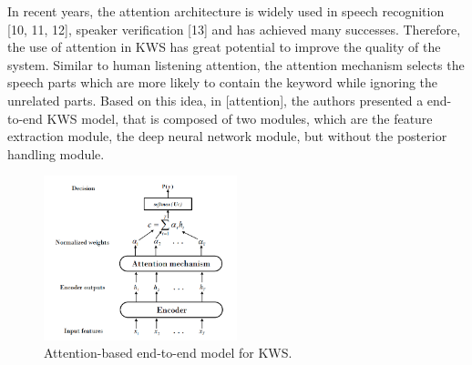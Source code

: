         In recent years, the attention architecture is widely used in speech recognition [10, 11, 12], speaker verification [13] and has achieved many successes. 
        Therefore, the use of attention in KWS has great potential to improve the quality of the system.
        Similar to human listening attention, the attention mechanism selects the speech parts which are more likely to contain the keyword while ignoring the unrelated parts.
        Based on this idea, in [attention], the authors presented a end-to-end KWS model, that is composed of two modules, which are the feature extraction module, the deep neural network module, but without the posterior handling module. 

        \begin{figure}
            \begin{center}
                \includegraphics[width=0.5\textwidth]{figures/attention_arch.png}
                \caption{Attention-based end-to-end model for KWS.}
                \label{fig:attention_arch}
            \end{center}
        \end{figure}

